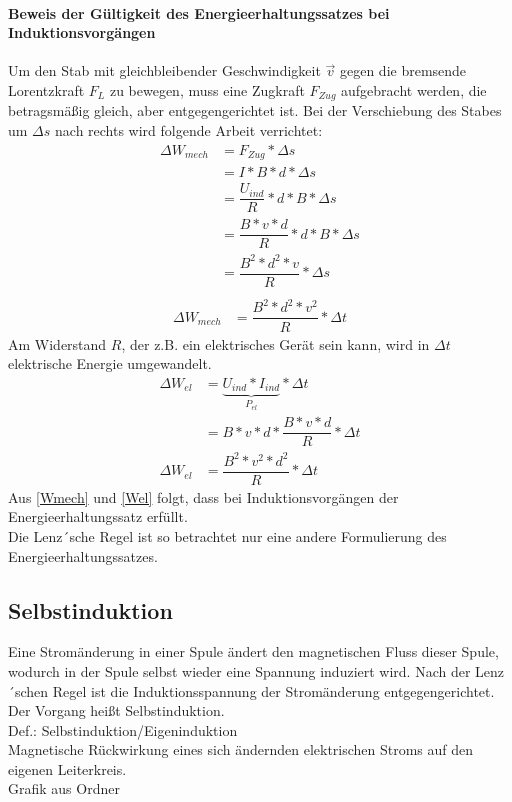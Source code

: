 	\paragraph{Beweis der Gültigkeit des Energieerhaltungssatzes bei Induktionsvorgängen} Um den Stab mit gleichbleibender Geschwindigkeit $\vec{v}$ gegen die bremsende Lorentzkraft $F_L$ zu bewegen, muss eine Zugkraft $F_{Zug}$ aufgebracht werden, die betragsmäßig gleich, aber entgegengerichtet ist.
	Bei der Verschiebung des Stabes um $\Delta s$ nach rechts wird folgende Arbeit verrichtet:\\
	\begin{align*}
		\Delta W_{mech} &= F_{Zug}*\Delta s\\
		&=I*B*d*\Delta s\\
		&=\dfrac{U_{ind}}{R}*d*B*\Delta s\\
		&=\dfrac{B*v*d}{R}*d*B*\Delta s\\
		&=\dfrac{B^2*d^2*v}{R}*\Delta s\\
	\end{align*}
	\begin{align}
		\Delta W_{mech}&=\dfrac{B^2*d^2*v^2}{R}*\Delta t\label{Wmech}
	\end{align}
	Am Widerstand $R$, der z.B. ein elektrisches Gerät sein kann, wird in $\Delta t$ elektrische Energie umgewandelt.
	\begin{align}
		\Delta W_{el} &= \underbrace{U_{ind} * I_{ind}}_{P_{el}}*\Delta t\nonumber\\
		&=B*v*d*\dfrac{B*v*d}{R}*\Delta t\nonumber\\
		\Delta W_{el}&=\dfrac{B^2*v^2*d^2}{R}*\Delta t\label{Wel}
	\end{align}
	Aus \ref{Wmech} und \ref{Wel} folgt, dass bei Induktionsvorgängen der Energieerhaltungssatz erfüllt.\\
	Die Lenz´sche Regel ist so betrachtet nur eine andere Formulierung des Energieerhaltungssatzes.
	\subsection{Selbstinduktion}
	Eine Stromänderung in einer Spule ändert den magnetischen Fluss dieser Spule, wodurch in der Spule selbst wieder eine Spannung induziert wird. Nach der Lenz´schen Regel ist die Induktionsspannung der Stromänderung entgegengerichtet. Der Vorgang heißt Selbstinduktion.\\
	Def.: Selbstinduktion/Eigeninduktion\\
	Magnetische Rückwirkung eines sich ändernden elektrischen Stroms auf den eigenen Leiterkreis.\\
	Grafik aus Ordner\\
